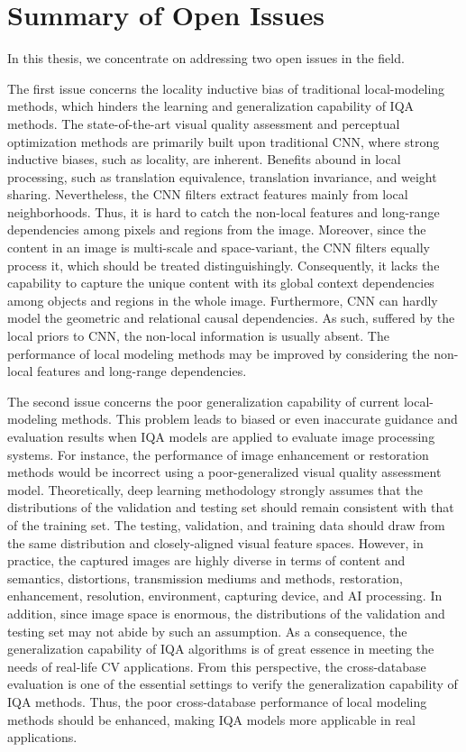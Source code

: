 \section{Summary of Open Issues}
In this thesis, we concentrate on addressing two open issues in the field.

The first issue concerns the locality inductive bias of traditional local-modeling methods, which hinders the learning and generalization capability of IQA methods. The state-of-the-art visual quality assessment and perceptual optimization methods are primarily built upon traditional CNN, where strong inductive biases, such as locality, are inherent. Benefits abound in local processing, such as translation equivalence, translation invariance, and weight sharing. Nevertheless, the CNN filters extract features mainly from local neighborhoods. Thus, it is hard to catch the non-local features and long-range dependencies among pixels and regions from the image. Moreover, since the content in an image is multi-scale and space-variant, the CNN filters equally process it, which should be treated distinguishingly. Consequently, it lacks the capability to capture the unique content with its global context dependencies among objects and regions in the whole image. Furthermore, CNN can hardly model the geometric and relational causal dependencies. As such, suffered by the local priors to CNN, the non-local information is usually absent. The performance of local modeling methods may be improved by considering the non-local features and long-range dependencies.

The second issue concerns the poor generalization capability of current local-modeling methods. This problem leads to biased or even inaccurate guidance and evaluation results when IQA models are applied to evaluate image processing systems. For instance, the performance of image enhancement or restoration methods would be incorrect using a poor-generalized visual quality assessment model. Theoretically, deep learning methodology strongly assumes that the distributions of the validation and testing set should remain consistent with that of the training set. The testing, validation, and training data should draw from the same distribution and closely-aligned visual feature spaces. However, in practice, the captured images are highly diverse in terms of content and semantics, distortions, transmission mediums and methods, restoration, enhancement, resolution, environment, capturing device, and AI processing. In addition, since image space is enormous, the distributions of the validation and testing set may not abide by such an assumption. As a consequence, the generalization capability of IQA algorithms is of great essence in meeting the needs of real-life CV applications. From this perspective, the cross-database evaluation is one of the essential settings to verify the generalization capability of IQA methods. Thus, the poor cross-database performance of local modeling methods should be enhanced, making IQA models more applicable in real applications.

